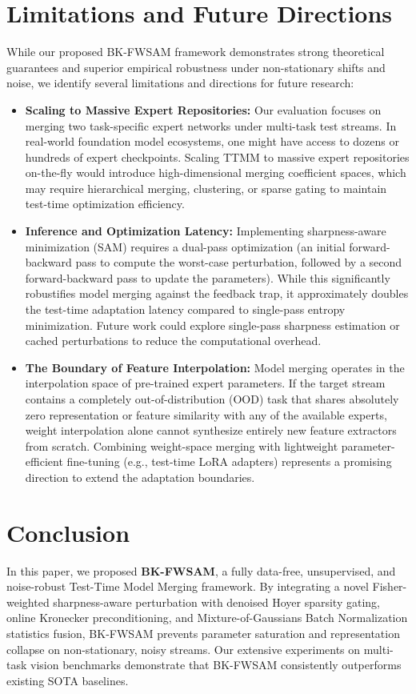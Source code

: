 \documentclass{article}
\theoremstyle{plain}
\theoremstyle{definition}
\theoremstyle{remark}
\begin{document}
\section{Limitations and Future Directions}
\label{sec:limitations}

While our proposed BK-FWSAM framework demonstrates strong theoretical guarantees and superior empirical robustness under non-stationary shifts and noise, we identify several limitations and directions for future research:
\begin{itemize}
  \item \textbf{Scaling to Massive Expert Repositories:} Our evaluation focuses on merging two task-specific expert networks under multi-task test streams. In real-world foundation model ecosystems, one might have access to dozens or hundreds of expert checkpoints. Scaling TTMM to massive expert repositories on-the-fly would introduce high-dimensional merging coefficient spaces, which may require hierarchical merging, clustering, or sparse gating to maintain test-time optimization efficiency.
  \item \textbf{Inference and Optimization Latency:} Implementing sharpness-aware minimization (SAM) requires a dual-pass optimization (an initial forward-backward pass to compute the worst-case perturbation, followed by a second forward-backward pass to update the parameters). While this significantly robustifies model merging against the feedback trap, it approximately doubles the test-time adaptation latency compared to single-pass entropy minimization. Future work could explore single-pass sharpness estimation or cached perturbations to reduce the computational overhead.
  \item \textbf{The Boundary of Feature Interpolation:} Model merging operates in the interpolation space of pre-trained expert parameters. If the target stream contains a completely out-of-distribution (OOD) task that shares absolutely zero representation or feature similarity with any of the available experts, weight interpolation alone cannot synthesize entirely new feature extractors from scratch. Combining weight-space merging with lightweight parameter-efficient fine-tuning (e.g., test-time LoRA adapters) represents a promising direction to extend the adaptation boundaries.
\end{itemize}

\section{Conclusion}
\label{sec:conclusion}

In this paper, we proposed \textbf{BK-FWSAM}, a fully data-free, unsupervised, and noise-robust Test-Time Model Merging framework. By integrating a novel Fisher-weighted sharpness-aware perturbation with denoised Hoyer sparsity gating, online Kronecker preconditioning, and Mixture-of-Gaussians Batch Normalization statistics fusion, BK-FWSAM prevents parameter saturation and representation collapse on non-stationary, noisy streams. Our extensive experiments on multi-task vision benchmarks demonstrate that BK-FWSAM consistently outperforms existing SOTA baselines.


\nocite{*}

\end{document}
